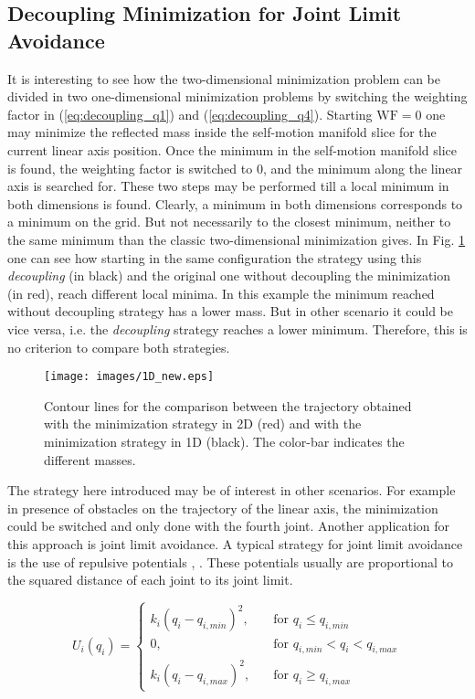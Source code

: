 \subsection{Decoupling Minimization for Joint Limit Avoidance}
\label{subsec:wf_JLA}

It is interesting to see how the two-dimensional minimization problem can be divided in two one-dimensional minimization problems by switching the weighting factor in (\ref{eq:decoupling_q1}) and (\ref{eq:decoupling_q4}). Starting  $\mathrm{WF  = 0}$  one may minimize the reflected mass inside the self-motion manifold slice for the current linear axis position. Once the minimum in the self-motion manifold slice is found, the weighting factor is switched to $0$, and the minimum along the linear axis is searched for. These two steps may be performed till a local minimum in both dimensions is found. 
Clearly, a minimum in both dimensions corresponds to a minimum on the grid. But not necessarily to the closest minimum, neither to the same minimum than the classic two-dimensional minimization gives. In  Fig. \ref{fig:1D} one can see how starting in the same configuration the strategy using this \textit{decoupling} (in black) and the original one without decoupling the minimization (in red), reach different local minima. In this example the minimum reached without decoupling strategy has a lower mass. But in other scenario it could be vice versa, i.e. the \textit{decoupling}  strategy reaches a lower minimum. 	Therefore, this is no criterion to compare both strategies.
%
\begin{figure}[!htb]
	\centerline{
		\texttt{[image: images/1D\_new.eps]}}
	\caption{Contour lines for the comparison between the trajectory obtained with the minimization strategy in 2D (red) and with the minimization strategy in 1D (black). The color-bar indicates the different masses.}
	\label{fig:1D}
\end{figure} 
%
The strategy here introduced may be of interest in other scenarios. For example in presence of obstacles on the trajectory of the linear axis, the minimization could be switched and only done with the fourth joint.
Another application for this approach is joint limit avoidance.
A typical strategy for joint limit avoidance is the use of repulsive potentials \cite{JLA_3}, \cite{JLA_4}. These potentials usually are proportional to the squared distance of each joint to its joint limit. 

\begin{equation} 
U_i(q_i) = 
\begin{cases}
k_{i} (q_{i} - q_{i,min})^{2}, &\quad\text{for \ }  q_i\le q_{i,min}\\
\text{0}, &\quad\text{for \ } q_{i,min} < q_i < q_{i,max}\\
k_{i} (q_{i} - q_{i,max})^{2}, &\quad\text{for \ }  q_i\ge q_{i,max}	
\end{cases}
\label{eq:JLA_dietrich}
\end{equation}


